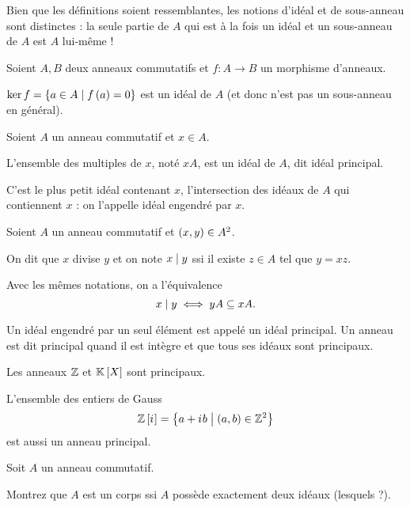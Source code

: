 \begin{rem}
Bien que les définitions soient ressemblantes, les notions d'idéal et de sous-anneau sont distinctes : la seule partie de \(A\) qui est à la fois un idéal et un sous-anneau de \(A\) est \(A\) lui-même !
\end{rem}

\begin{prop}
Soient \(A,B\) deux anneaux commutatifs et \(f:A\to B\) un morphisme d'anneaux.

\(\ker f=\left\lbrace a\in A\;\middle|\; f\left(a\right)=0\right\rbrace\) est un idéal de \(A\) (et donc n'est pas un sous-anneau en général).
\end{prop}

\begin{prop}
Soient \(A\) un anneau commutatif et \(x\in A\).

L'ensemble des multiples de \(x\), noté \(xA\), est un idéal de \(A\), dit idéal principal.

C'est le plus petit idéal contenant \(x\), \cad l'intersection des idéaux de \(A\) qui contiennent \(x\) : on l'appelle idéal engendré par \(x\).
\end{prop}

\begin{defi}
Soient \(A\) un anneau commutatif et \(\left(x,y\right)\in A^2\).

On dit que \(x\) divise \(y\) et on note \(x\mid y\) ssi il existe \(z\in A\) tel que \(y=xz\).
\end{defi}

\begin{prop}
Avec les mêmes notations, on a l'équivalence \[x\mid y\iff yA\subseteq xA.\]
\end{prop}

Un idéal engendré par un seul élément est appelé un idéal principal. Un anneau est dit principal quand il est intègre et que tous ses idéaux sont principaux.

\begin{prop}
Les anneaux \(\mathbb{Z}\) et \(\poly\) sont principaux.
\end{prop}

\begin{rem}
L'ensemble des entiers de Gauss \[\mathbb{Z}\left[i\mkern1mu\right]=\left\lbrace a+i\mkern1mu b\;\middle|\;\left(a,b\right)\in\mathbb{Z}^2\right\rbrace\] est aussi un anneau principal.
\end{rem}

\begin{exo}
Soit \(A\) un anneau commutatif.

Montrez que \(A\) est un corps ssi \(A\) possède exactement deux idéaux (lesquels ?).
\end{exo}

